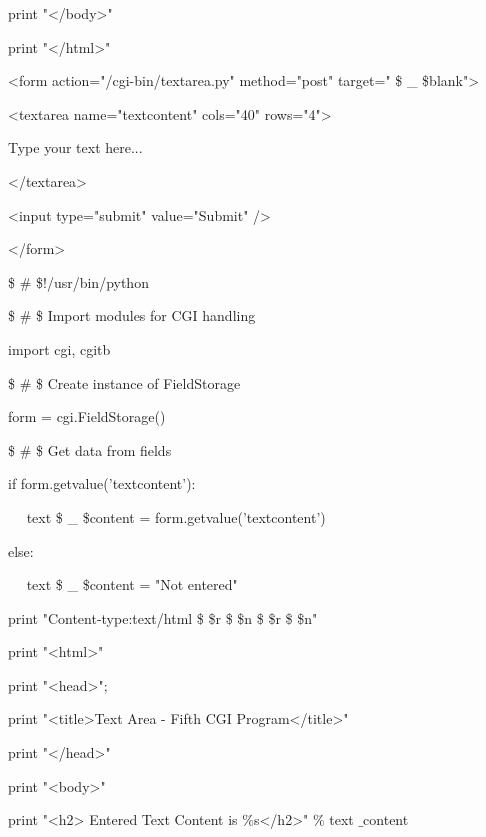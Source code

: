 \begin{12pt}
\begin{12pt}
\noindent 
print "</body>" \par
\noindent 
print "</html>" \par
\vspace{12pt}
\noindent 
<form action="/cgi-bin/textarea.py" method="post" target=" \$  \_  \$blank"> \par
\noindent 
<textarea name="textcontent" cols="40" rows="4"> \par
\noindent 
Type your text here... \par
\noindent 
</textarea> \par
\noindent 
<input type="submit" value="Submit" /> \par
\noindent 
</form> \par
\vspace{12pt}
\noindent 
 \$  \#  \$!/usr/bin/python \par
\vspace{12pt}
\noindent 
 \$  \#  \$ Import modules for CGI handling  \par
\noindent 
import cgi, cgitb  \par
\vspace{12pt}
\noindent 
 \$  \#  \$ Create instance of FieldStorage  \par
\noindent 
form = cgi.FieldStorage()  \par
\vspace{12pt}
\noindent 
 \$  \#  \$ Get data from fields \par
\noindent 
if form.getvalue('textcontent'): \par
\noindent 
~~ text \$  \_  \$content = form.getvalue('textcontent') \par
\noindent 
else: \par
\noindent 
~~ text \$  \_  \$content = "Not entered" \par
\vspace{12pt}
\noindent 
print "Content-type:text/html \$  \setminus  \$r \$  \setminus  \$n \$  \setminus  \$r \$  \setminus  \$n" \par
\noindent 
print "<html>" \par
\noindent 
print "<head>"; \par
\noindent 
print "<title>Text Area - Fifth CGI Program</title>" \par
\noindent 
print "</head>" \par
\noindent 
print "<body>" \par
\noindent 
print "<h2> Entered Text Content is  $  \%  $s</h2>"  $  \%  $ text $  \_  $content \par

\end{12pt}
\end{12pt}
